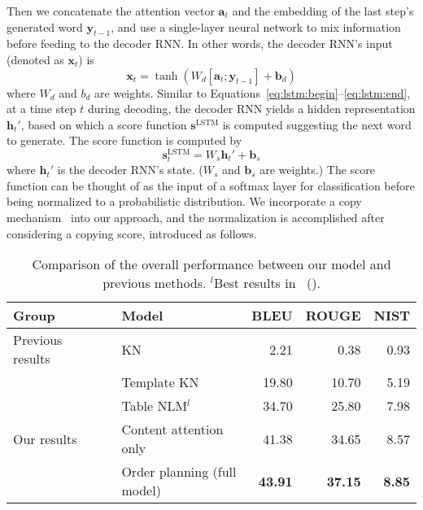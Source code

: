 \documentclass[letterpaper]{article} %
\newcommand{\newcite}[1]{\citeauthor{#1}~(\citeyear{#1})}
\begin{document}
Then we concatenate the attention vector $\bm a_t$ and the embedding of the last step's generated word $\bm y_{t-1}$, and use a single-layer neural network to mix information before feeding to the decoder RNN. In other words, the decoder RNN's input (denoted as $\bm x_t$) is
\begin{equation}
\bm x_t=\tanh(W_d[\bm a_t; \bm y_{t-1}]+\bm b_d)\label{eqn:RNNinput}
\end{equation}
where $W_d$ and $b_d$ are weights. Similar to Equations~\ref{eq:lstm:begin}--\ref{eq:lstm:end}, at a time step $t$ during decoding, the decoder RNN yields a hidden representation $\bm h_t'$, based on which a score function $\bm s^\text{LSTM}$ is computed suggesting the next word to generate. The score function is computed by
\begin{equation}
\bm s_t^\text{LSTM}=W_s\bm h_t'+\bm b_s
\end{equation}
where $\bm h_t'$ is the decoder RNN's state. ($W_s$ and $\bm  b_s$ are weights.) The score function can be thought of as the input of a softmax layer  for classification before being normalized to a probabilistic distribution. We incorporate a copy mechanism~\cite{copynet} into our approach, and the normalization is accomplished after considering  a copying score, introduced as follows.

\begin{table*}[!t]
	\begin{center}
		\begin{tabular}{llrrr}\toprule
			\textbf{Group}&\textbf{Model} & \textbf{BLEU} &\textbf{ROUGE} &\textbf{NIST}\\
			\midrule
			Previous results\ \ \ \  &	KN & 2.21& 0.38& 0.93\\
			&Template KN      &19.80 & 10.70& 5.19\\
			\cmidrule{2-5}
			&	Table NLM$^l$ & 34.70&25.80 &7.98 \\\midrule
			Our results & Content attention only\ \ \ \ &41.38 &34.65 & 8.57\\
			& Order planning (full model)         &\textbf{43.91} &\textbf{37.15} & \textbf{8.85}\\
			\bottomrule
		\end{tabular}
	\end{center}
	\vspace{-.2cm}
	\caption{Comparison of the overall performance between our model and previous methods. $^l$Best results in \protect\newcite{wikibio}.}
	\vspace{-.3cm}
	\label{tab:overall}
\end{table*}
\end{document}
